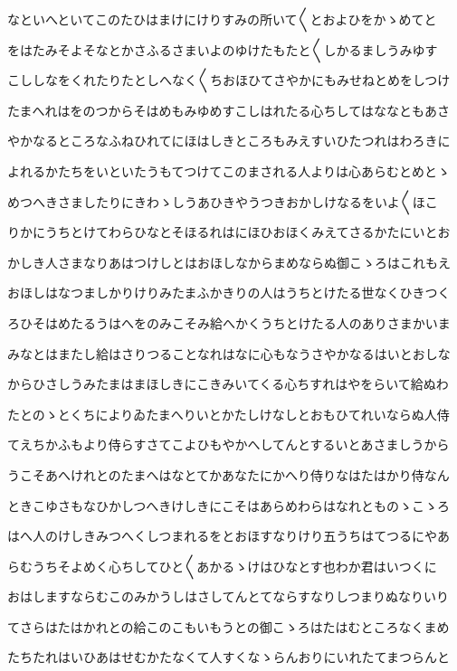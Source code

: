 \documentclass[a4paper,11pt,landscape]{ltjtarticle}
\begin{document}
なといへといてこのたひはまけにけりすみの所いて〱とおよひをかゝめてと
\par\medskip
をはたみそよそなとかさふるさまいよのゆけたもたと〱しかるましうみゆす
\par\medskip
こししなをくれたりたとしへなく〱ちおほひてさやかにもみせねとめをしつけ
\par\medskip
たまへれはをのつからそはめもみゆめすこしはれたる心ちしてはななともあさ
\par\medskip
やかなるところなふねひれてにほはしきところもみえすいひたつれはわろきに
\par\medskip
よれるかたちをいといたうもてつけてこのまされる人よりは心あらむとめとゝ
\par\medskip
めつへきさましたりにきわゝしうあひきやうつきおかしけなるをいよ〱ほこ
\par\medskip
りかにうちとけてわらひなとそほるれはにほひおほくみえてさるかたにいとお
\par\medskip
かしき人さまなりあはつけしとはおほしなからまめならぬ御こゝろはこれもえ
\par\medskip
おほしはなつましかりけりみたまふかきりの人はうちとけたる世なくひきつく
\par\medskip
ろひそはめたるうはへをのみこそみ給へかくうちとけたる人のありさまかいま
\par\medskip
みなとはまたし給はさりつることなれはなに心もなうさやかなるはいとおしな
\par\medskip
からひさしうみたまはまほしきにこきみいてくる心ちすれはやをらいて給ぬわ
\par\medskip
たとのゝとくちによりゐたまへりいとかたしけなしとおもひてれいならぬ人侍
\par\medskip
てえちかふもより侍らすさてこよひもやかへしてんとするいとあさましうから
\par\medskip
うこそあへけれとのたまへはなとてかあなたにかへり侍りなはたはかり侍なん
\par\medskip
ときこゆさもなひかしつへきけしきにこそはあらめわらはなれとものゝこゝろ
\par\medskip
はへ人のけしきみつへくしつまれるをとおほすなりけり五うちはてつるにやあ
\par\medskip
らむうちそよめく心ちしてひと〱あかるゝけはひなとす也わか君はいつくに
\par\medskip
おはしますならむこのみかうしはさしてんとてならすなりしつまりぬなりいり
\par\medskip
てさらはたはかれとの給このこもいもうとの御こゝろはたはむところなくまめ
\par\medskip
たちたれはいひあはせむかたなくて人すくなゝらんおりにいれたてまつらんと
\end{document}
